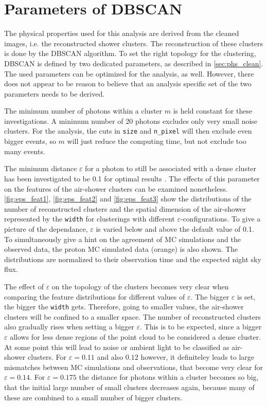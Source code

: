 \section{Parameters of DBSCAN}
%
The physical properties used for this analysis are derived from the cleaned
images, i.e. the reconstructed shower clusters. The reconstruction of these
clusters is done by the DBSCAN algorithm. To set the right topology for the
clustering, DBSCAN is defined by two dedicated parameters, as described in
\autoref{sec:phs_clean}. The used parameters can be optimized for the analysis,
as well. However, there does not appear to be reason to believe that an
analysis specific set of the two parameters needs to be derived.

The minimum number of photons within a cluster $m$ is held constant for these investigations. A
minimum number of \num{20} photons excludes only very small noise clusters. For
the analysis, the cuts in \texttt{size} and \texttt{n\_pixel} will then
exclude even bigger events, so $m$ will just reduce the computing time, but not exclude too many events.

The minimum distance $\varepsilon$ for a photon to still be associated with a
dense cluster has been investigated to be \num{0.1} for optimal results \cite{sebastian}. The
effects of this parameter on the features of the air-shower clusters can be
examined nonetheless. \autoref{fig:eps_feat1}, \ref{fig:eps_feat2} and
\ref{fig:eps_feat3} show the distributions of the number of reconstructed
clusters and the spatial dimension of the air-shower represented by the
\texttt{width} for clusterings with different $\varepsilon$-configurations. To
give a picture of the dependance, $\varepsilon$ is varied below and above the
default value of \num{0.1}. To simultaneously give a hint on the agreement of
MC simulations and the observed data, the proton MC simulated data (orange) is
also shown. The distributions are normalized to their observation time and the
expected night sky flux.

The effect of $\varepsilon$ on the topology of the clusters becomes very clear
when comparing the feature distributions for different values of $\varepsilon$.
The bigger $\varepsilon$ is set, the bigger the \texttt{width} gets. Therefore,
going to smaller values, the air-shower clusters will be confined to a smaller
space. The number of reconstructed clusters also gradually rises when setting
a bigger $\varepsilon$. This is to be expected, since a bigger $\varepsilon$
allows for less dense regions of the point cloud to be considered a dense
cluster. At some point this will lead to noise or ambient light to be
classified as air-shower clusters. For $\varepsilon = 0.11$ and also $0.12$ however, it
definiteley leads to large mismatches between MC simulations and observations, that
become very clear for $\varepsilon = 0.14$. For $\varepsilon = 0.175$ the
distance for photons within a cluster becomes so big, that the initial large
number of small clusters decreases again, because many of these are combined to
a small number of bigger clusters.

